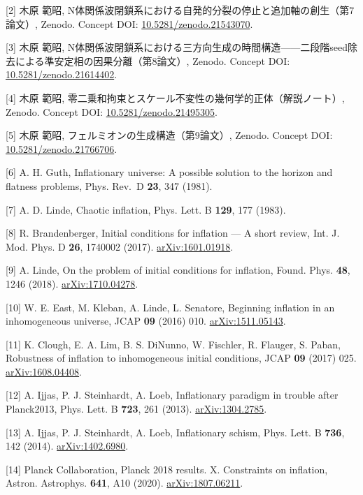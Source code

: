 \documentclass[
  a4paper,
]{ltjsarticle}
\begin{document}
{[}2{]} 木原 範昭,
N体関係波閉鎖系における自発的分裂の停止と追加軸の創生（第7論文）,
Zenodo. Concept DOI:
\href{https://doi.org/10.5281/zenodo.21543070}{10.5281/zenodo.21543070}.

{[}3{]} 木原 範昭,
N体関係波閉鎖系における三方向生成の時間構造------二段階seed除去による準安定相の因果分離（第8論文）,
Zenodo. Concept DOI:
\href{https://doi.org/10.5281/zenodo.21614402}{10.5281/zenodo.21614402}.

{[}4{]} 木原 範昭,
零二乗和拘束とスケール不変性の幾何学的正体（解説ノート）, Zenodo.
Concept DOI:
\href{https://doi.org/10.5281/zenodo.21495305}{10.5281/zenodo.21495305}.

{[}5{]} 木原 範昭, フェルミオンの生成構造（第9論文）, Zenodo. Concept
DOI:
\href{https://doi.org/10.5281/zenodo.21766706}{10.5281/zenodo.21766706}.

{[}6{]} A. H. Guth, Inflationary universe: A possible solution to the
horizon and flatness problems, Phys. Rev.~D \textbf{23}, 347 (1981).

{[}7{]} A. D. Linde, Chaotic inflation, Phys. Lett. B \textbf{129}, 177
(1983).

{[}8{]} R. Brandenberger, Initial conditions for inflation --- A short
review, Int. J. Mod. Phys. D \textbf{26}, 1740002 (2017).
\href{https://arxiv.org/abs/1601.01918}{arXiv:1601.01918}.

{[}9{]} A. Linde, On the problem of initial conditions for inflation,
Found. Phys. \textbf{48}, 1246 (2018).
\href{https://arxiv.org/abs/1710.04278}{arXiv:1710.04278}.

{[}10{]} W. E. East, M. Kleban, A. Linde, L. Senatore, Beginning
inflation in an inhomogeneous universe, JCAP \textbf{09} (2016) 010.
\href{https://arxiv.org/abs/1511.05143}{arXiv:1511.05143}.

{[}11{]} K. Clough, E. A. Lim, B. S. DiNunno, W. Fischler, R. Flauger,
S. Paban, Robustness of inflation to inhomogeneous initial conditions,
JCAP \textbf{09} (2017) 025.
\href{https://arxiv.org/abs/1608.04408}{arXiv:1608.04408}.

{[}12{]} A. Ijjas, P. J. Steinhardt, A. Loeb, Inflationary paradigm in
trouble after Planck2013, Phys. Lett. B \textbf{723}, 261 (2013).
\href{https://arxiv.org/abs/1304.2785}{arXiv:1304.2785}.

{[}13{]} A. Ijjas, P. J. Steinhardt, A. Loeb, Inflationary schism, Phys.
Lett. B \textbf{736}, 142 (2014).
\href{https://arxiv.org/abs/1402.6980}{arXiv:1402.6980}.

{[}14{]} Planck Collaboration, Planck 2018 results. X. Constraints on
inflation, Astron. Astrophys. \textbf{641}, A10 (2020).
\href{https://arxiv.org/abs/1807.06211}{arXiv:1807.06211}.
\end{document}
